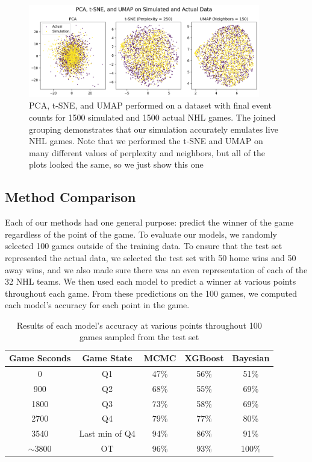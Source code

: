 \documentclass[11pt]{article}
\begin{document}
\begin{figure}
    \centering
    \includegraphics[width=0.9\textwidth]{images/pca_tsne_umap_sim_act.png}
    \caption{PCA, t-SNE, and UMAP performed on a dataset with final event counts for 1500 simulated and 1500 actual NHL games. The joined grouping demonstrates that our simulation accurately emulates live NHL games. Note that we performed the t-SNE and UMAP on many different values of perplexity and neighbors, but all of the plots looked the same, so we just show this one}
    \label{fig:simulation_v_actual}
\end{figure}

\subsection{Method Comparison}
Each of our methods had one general purpose: predict the winner of the game regardless of the point of the game. 
To evaluate our models, we randomly selected 100 games outside of the training data. 
To ensure that the test set represented the actual data, we selected the test set with 50 home wins and 50 away wins, 
and we also made sure there was an even representation of each of the 32 NHL teams. 
We then used each model to predict a winner at various points throughout each game. 
From these predictions on the 100 games, we computed each model's accuracy for each point in the game.

\begin{table}
    \centering
    \begin{tabular}{ |c|c|c|c|c| } 
    \hline
    \textbf{Game Seconds} & \textbf{Game State} & \textbf{MCMC} & \textbf{XGBoost} & \textbf{Bayesian} \\ 
    \hline
    0 & Q1 & 47\% & 56\% & 51\% \\ 
    \hline
    900 & Q2 & 68\% & 55\% & 69\% \\
    \hline
    1800 & Q3 & 73\% & 58\% & 69\% \\
    \hline
    2700 & Q4 & 79\% & 77\% & 80\% \\
    \hline
    3540 & Last min of Q4 & 94\% & 86\% & 91\% \\
    \hline
     \(\sim \)3800 & OT & 96\% & 93\% & 100\% \\
    \hline
    \end{tabular}
    \caption{Results of each model's accuracy at various points throughout 100 games sampled from the test set}
    \label{tab:game_accuracies}
\end{table}
\end{document}
